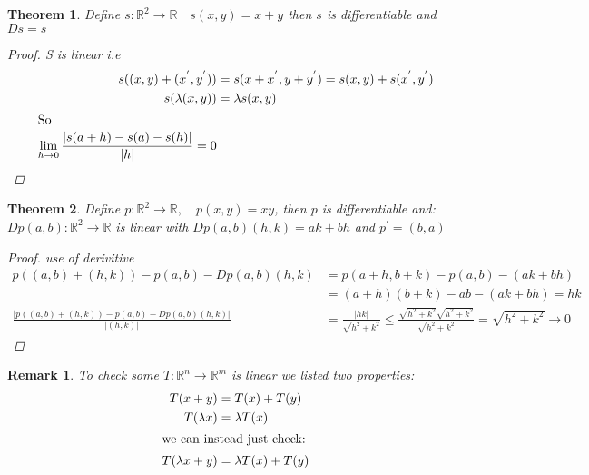\documentclass[11pt]{article}
\def\RR{\mathbb{R}}
\newtheorem{theorem}{Theorem}[section]
\newtheorem*{remark}{Remark}
\begin{document}
\begin{theorem}\label{s}
Define $s:\RR^2 \rightarrow \RR \quad s(x,y)=x + y$ then $s$ is differentiable  and $Ds = s$
\begin{proof}
S is linear i.e
\begin{align*}
s((x,y) + (x^{'},y^{'})) &=s(x+x^{'},y+y^{'})= s(x,y) + s(x^{'},y^{'})\\
s(\lambda(x,y)) &= \lambda s(x,y)\\
\intertext{So}
\lim_{h \to 0}\frac{|s(a+h) - s(a) -s(h)|}{|h|} = 0
\end{align*}
\end{proof}
\end{theorem}

\begin{theorem}\label{p}
Define $p:\RR^2 \rightarrow \RR, \quad p(x,y)=xy$, then $p$ is differentiable  and:\\
$Dp(a,b):\RR^2 \rightarrow \RR$ is linear with $Dp(a,b)(h,k) = ak + bh$ and $p^{'} = (b,a)$
\begin{proof}
use of derivitive
\begin{align*}
p((a,b)+(h,k)) - p(a,b) - Dp(a,b)(h,k) &= p(a+h,b+k) - p(a,b) - (ak + bh)\\
&=(a+h)(b+k) - ab - (ak + bh) = hk\\
\frac{|p((a,b)+(h,k)) - p(a,b) - Dp(a,b)(h,k)|}{|(h,k)|} &= \frac{|hk|}{\sqrt{h^2 + k^2}} \leq  \frac{\sqrt{h^2 + k^2}\sqrt{h^2 + k^2}}{\sqrt{h^2 + k^2}} = \sqrt{h^2 + k^2} \rightarrow 0
\end{align*}
\end{proof}
\end{theorem}

\begin{remark}
To check some $T:\RR^n \rightarrow \RR^m$ is linear we listed two properties:
\begin{align*}
T(x+y) &= T(x) +T(y)\\
T(\lambda x) &= \lambda T(x)\\
\shortintertext{we can instead just check:}
T( \lambda x + y) &= \lambda T(x) + T(y)
\end{align*}
\end{remark}
\end{document}
